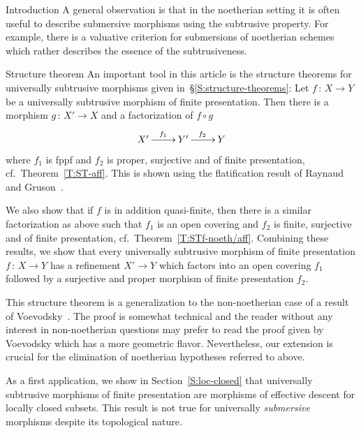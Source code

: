 \documentclass[a4paper,twoside,11pt]{amsart}[2009/07/02] %
\newcommand{\pref}[1]{\eqref{#1}}
\newcommand{\map}[3]{#1\,:\, #2\rightarrow #3}
\begin{document}
\begin{section}{Introduction}
A general observation is that in the noetherian setting it is often useful to 
describe submersive morphisms using the subtrusive property.
For example, there is a valuative criterion for submersions of noetherian
schemes~\cite[Prop.~3.7]{kollar_quotients} which rather describes the essence
of the subtrusiveness.

\begin{subsection}{Structure theorem}
An important tool in this article is the structure theorems for universally
subtrusive morphisms given in~\S\ref{S:structure-theorems}: Let $\map{f}{X}{Y}$
be a universally subtrusive morphism of finite presentation. Then there is a
morphism $\map{g}{X'}{X}$ and a factorization of $f\circ g$
%
$$\xymatrix{X'\ar[r]^{f_1} & Y'\ar[r]^{f_2} & Y}$$
%
where $f_1$ is fppf and $f_2$ is proper, surjective and of finite presentation,
cf.\ Theorem~\pref{T:ST-aff}. This is shown using the flatification
result of Raynaud and Gruson~\cite{raynaud-gruson}.

We also show that if $f$ is in addition quasi-finite, then there is a similar
factorization as above such that $f_1$ is an open covering and $f_2$ is finite,
surjective and of finite presentation, cf.\ Theorem~\pref{T:STf-noeth/aff}.
Combining these results, we show that every universally subtrusive morphism of
finite presentation $\map{f}{X}{Y}$ has a refinement $X'\to Y$ which factors
into an open covering $f_1$ followed by a surjective and proper morphism of
finite presentation $f_2$.

This structure theorem is a generalization to the non-noetherian case of a
result of Voevodsky~\cite[Thm.~3.1.9]{voevodsky_homology}. The proof is
somewhat technical and the reader without any interest in non-noetherian
questions may prefer to read the proof given by Voevodsky which has a more
geometric flavor. Nevertheless, our extension is crucial for the elimination
of noetherian hypotheses referred to above.

As a first application, we show in Section~\ref{S:loc-closed} that universally
subtrusive morphisms of finite presentation are morphisms of effective descent
for locally closed subsets. This result is not true for universally
\emph{submersive} morphisms despite its topological nature.
\end{subsection}


\end{section}
\end{document}

